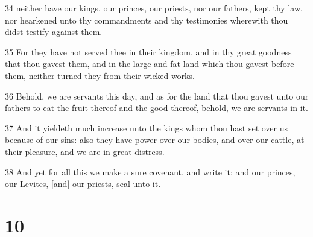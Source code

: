 \par 34 neither have our kings, our princes, our priests, nor our fathers, kept thy law, nor hearkened unto thy commandments and thy testimonies wherewith thou didst testify against them.
\par 35 For they have not served thee in their kingdom, and in thy great goodness that thou gavest them, and in the large and fat land which thou gavest before them, neither turned they from their wicked works.
\par 36 Behold, we are servants this day, and as for the land that thou gavest unto our fathers to eat the fruit thereof and the good thereof, behold, we are servants in it.
\par 37 And it yieldeth much increase unto the kings whom thou hast set over us because of our sins: also they have power over our bodies, and over our cattle, at their pleasure, and we are in great distress.
\par 38 And yet for all this we make a sure covenant, and write it; and our princes, our Levites, [and] our priests, seal unto it.

\chapter{10}


